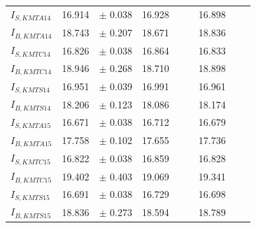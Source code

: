 \begin{tabular}{lllllllll}
$I_{S, KMTA14}$ &      16.914 &       $\pm$ 0.038 &            16.928 &                          &                          &                16.898 &                              &                              \\
$I_{B, KMTA14}$ &      18.743 &       $\pm$ 0.207 &            18.671 &                          &                          &                18.836 &                              &                              \\
$I_{S, KMTC14}$ &      16.826 &       $\pm$ 0.038 &            16.864 &                          &                          &                16.833 &                              &                              \\
$I_{B, KMTC14}$ &      18.946 &       $\pm$ 0.268 &            18.710 &                          &                          &                18.898 &                              &                              \\
$I_{S, KMTS14}$ &      16.951 &       $\pm$ 0.039 &            16.991 &                          &                          &                16.961 &                              &                              \\
$I_{B, KMTS14}$ &      18.206 &       $\pm$ 0.123 &            18.086 &                          &                          &                18.174 &                              &                              \\
$I_{S, KMTA15}$ &      16.671 &       $\pm$ 0.038 &            16.712 &                          &                          &                16.679 &                              &                              \\
$I_{B, KMTA15}$ &      17.758 &       $\pm$ 0.102 &            17.655 &                          &                          &                17.736 &                              &                              \\
$I_{S, KMTC15}$ &      16.822 &       $\pm$ 0.038 &            16.859 &                          &                          &                16.828 &                              &                              \\
$I_{B, KMTC15}$ &      19.402 &       $\pm$ 0.403 &            19.069 &                          &                          &                19.341 &                              &                              \\
$I_{S, KMTS15}$ &      16.691 &       $\pm$ 0.038 &            16.729 &                          &                          &                16.698 &                              &                              \\
$I_{B, KMTS15}$ &      18.836 &       $\pm$ 0.273 &            18.594 &                          &                          &                18.789 &                              &                              \\
\bottomrule
\end{tabular}
